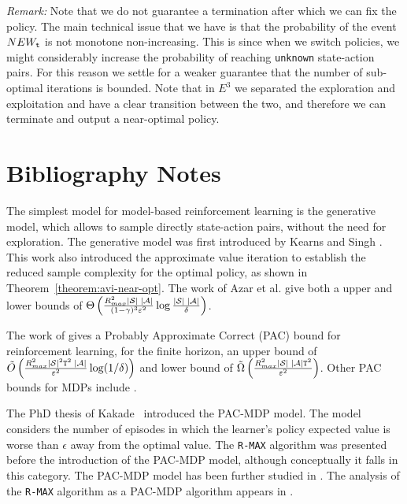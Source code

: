 
\noindent\textit{Remark:} Note that we do not guarantee a termination after which we can fix the policy. The main technical issue that we have is that the probability of the event $NEW_{\tt t}$ is not monotone non-increasing. This is since when we switch policies, we might considerably increase the probability of reaching \texttt{unknown} state-action pairs. For this reason we settle for a weaker guarantee that the number of sub-optimal iterations is bounded. Note that in $E^3$ we separated the exploration and exploitation and have a clear transition between the two, and therefore we can terminate and output a near-optimal policy.


\section{Bibliography Notes}

The simplest model for model-based reinforcement learning is the generative model, which allows to sample directly state-action pairs, without the need for exploration.
The generative model was first introduced by Kearns and Singh \cite{KearnsS98a}. This work also introduced the approximate value iteration to establish the reduced sample complexity for the optimal policy, as shown in Theorem~\ref{theorem:avi-near-opt}.
The work of Azar et al. \cite{AzarMK13} give both a upper and lower bounds of 
$
\Theta \left(\frac{R^2_{max}|\mathcal{S}|\;|\mathcal{A}|}{(1-\gamma)^3\varepsilon^2}\log \frac{ |\mathcal{S}| \;|\mathcal{A}| }{\delta}\right)
$.

The work of \cite{DannB15} gives a Probably Approximate Correct (PAC) bound for reinforcement learning, for the finite horizon, an upper bound of $
\tilde{O} \left(\frac{R^2_{max}|\mathcal{S}|^2{\tt T}^2\;|\mathcal{A}|}{\varepsilon^2}\log(1/\delta)\right)
$ and lower bound of $
\tilde{\Omega} \left(\frac{R^2_{max}|\mathcal{S}|\;|\mathcal{A}|{\tt T}^2}{\varepsilon^2}\right)
$. Other PAC bounds for MDPs include \cite{SzitaL09,SzitaS10,LattimoreH14a}.

The PhD thesis of Kakade~\cite{Kakade2003} introduced the PAC-MDP model. The model considers the number of episodes in which the learner's policy expected value is worse than $\epsilon$ away from the optimal value. 
%
The {\tt R-MAX} algorithm  \cite{BrafmanT02} was presented before the introduction of the PAC-MDP model, although conceptually it falls in this category.
%
The PAC-MDP model has been further studied in  \cite{StrehlL08,StrehlLL09,Li2012}. The  analysis of the {\tt R-MAX} algorithm as a PAC-MDP algorithm appears in \cite{StrehlL08,SzitaL09}.

